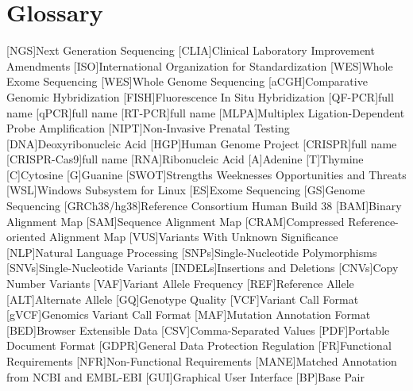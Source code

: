 \chapter{Glossary}

\footnotesize
\SingleSpacing

\begin{multicols}{2}
\begin{acronym}[AAAAAA]

	[NGS]{Next Generation Sequencing}
	[CLIA]{Clinical Laboratory Improvement Amendments}
	[ISO]{International Organization for Standardization}
	[WES]{Whole Exome Sequencing}
	[WES]{Whole Genome Sequencing}
	[aCGH]{Comparative Genomic Hybridization}
	[FISH]{Fluorescence In Situ Hybridization}
	[QF-PCR]{full name}
	[qPCR]{full name}
	[RT-PCR]{full name}
	[MLPA]{Multiplex Ligation-Dependent Probe Amplification}
	[NIPT]{Non-Invasive Prenatal Testing}
	[DNA]{Deoxyribonucleic Acid}
	[HGP]{Human Genome Project}
	[CRISPR]{full name}
	[CRISPR-Cas9]{full name}
	[RNA]{Ribonucleic Acid}
	{Adenine}
	{Thymine}
	{Cytosine}
	{Guanine}
	[SWOT]{Strengths Weeknesses Opportunities and Threats}
	[WSL]{Windows Subsystem for Linux}
	[ES]{Exome Sequencing}
	[GS]{Genome Sequencing}
	[GRCh38/hg38]{Reference Consortium Human Build 38}
	[BAM]{Binary Alignment Map}
	[SAM]{Sequence Alignment Map}
	[CRAM]{Compressed Reference-oriented Alignment Map}
	[VUS]{Variants With Unknown Significance}
	[NLP]{Natural Language Processing}
	[SNPs]{Single-Nucleotide Polymorphisms}
	[SNVs]{Single-Nucleotide Variants}
	[INDELs]{Insertions and Deletions}
	[CNVs]{Copy Number Variants}
	[VAF]{Variant Allele Frequency}
	[REF]{Reference Allele}
	[ALT]{Alternate Allele}
	[GQ]{Genotype Quality}
	[VCF]{Variant Call Format}
	[gVCF]{Genomics Variant Call Format}
	[MAF]{Mutation Annotation Format}
	[BED]{Browser Extensible Data}
	[CSV]{Comma-Separated Values}
	[PDF]{Portable Document Format}
	[GDPR]{General Data Protection Regulation}
	[FR]{Functional Requirements}
	[NFR]{Non-Functional Requirements}
	[MANE]{Matched Annotation from NCBI and EMBL-EBI}
	[GUI]{Graphical User Interface}
	[BP]{Base Pair}


\end{acronym}
\end{multicols}

